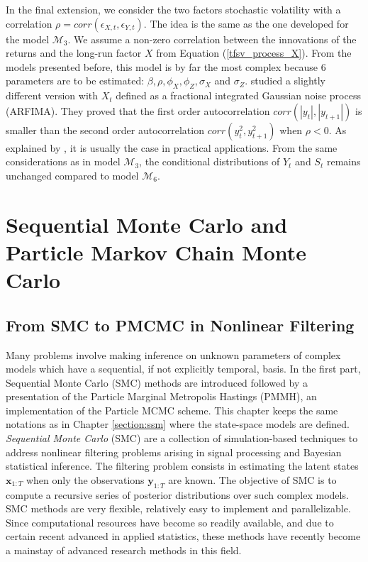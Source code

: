 \documentclass[11pt,a4,twosided,singlespacing,titlepagenumber=on]{scrreprt}
\numberwithin{equation}{chapter} %
\theoremstyle{remark}
\newcommand{\matr}[1]{\mathbf{#1}}
\begin{document}
In the final extension, we consider the two factors stochastic volatility with a correlation $\rho = corr(\epsilon_{X,t}, \epsilon_{Y,t})$. The idea is the same as the one developed for the model $\mathcal{M}_3$. We assume a non-zero correlation between the innovations of the returns and the long-run factor $X$ from Equation (\ref{tfsv_process_X}). From the models presented before, this model is by far the most complex because 6 parameters are to be estimated: $\beta, \rho, \phi_X, \phi_Z, \sigma_X$ and $\sigma_Z$. \cite{ruiz2008} studied a slightly different version with $X_t$ defined as a fractional integrated Gaussian noise process (ARFIMA). They proved that the first order autocorrelation $corr(|y_t|,|y_{t+1}|)$ is smaller than the second order autocorrelation $corr(y_t^2,y_{t+1}^2)$ when $\rho < 0$. As explained by \cite{cont2005}, it is usually the case in practical applications. From the same considerations as in model $\mathcal{M}_3$, the conditional distributions of $Y_t$ and $S_t$ remains unchanged compared to model $\mathcal{M}_6$.

\chapter{Sequential Monte Carlo and Particle Markov Chain Monte Carlo}
\label{section:pmcmc}
\section{From SMC to PMCMC in Nonlinear Filtering}
Many problems involve making inference on unknown parameters of complex models which have a sequential, if not explicitly temporal, basis. In the first part, Sequential Monte Carlo (SMC) methods are introduced followed by a presentation of the Particle Marginal Metropolis Hastings (PMMH), an implementation of the Particle MCMC scheme. This chapter keeps the same notations as in Chapter \ref{section:ssm} where the state-space models are defined.\\

\textit{Sequential Monte Carlo} (SMC) are a collection of simulation-based techniques to address nonlinear filtering problems arising in signal processing and Bayesian statistical inference. The filtering problem consists in estimating the latent states $\matr{x}_{1:T}$ when only the observations $\matr{y}_{1:T}$ are known. The objective of SMC is to compute a recursive series of posterior distributions over such complex models. SMC methods are very flexible, relatively easy to implement and parallelizable. Since computational resources have become so readily available, and due to certain recent advanced in applied statistics, these methods have recently become a mainstay of advanced research methods in this field.\\
\end{document}
